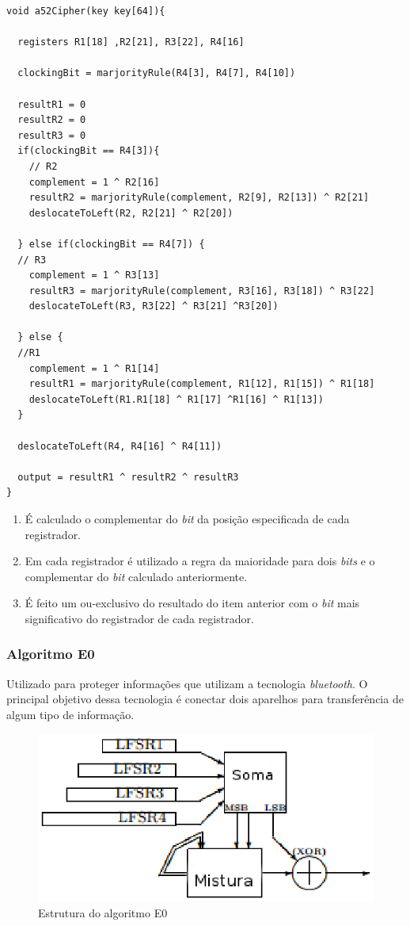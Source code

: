 \begin{lstlisting}[caption={Pseudo-código A5/2}, label=a52-pseudo-code]
void a52Cipher(key key[64]){

  registers R1[18] ,R2[21], R3[22], R4[16]

  clockingBit = marjorityRule(R4[3], R4[7], R4[10])
  
  resultR1 = 0  
  resultR2 = 0  
  resultR3 = 0
  if(clockingBit == R4[3]){
  	// R2 
  	complement = 1 ^ R2[16]
  	resultR2 = marjorityRule(complement, R2[9], R2[13]) ^ R2[21]
  	deslocateToLeft(R2, R2[21] ^ R2[20])
  
  } else if(clockingBit == R4[7]) {
  // R3
  	complement = 1 ^ R3[13]
  	resultR3 = marjorityRule(complement, R3[16], R3[18]) ^ R3[22]
  	deslocateToLeft(R3, R3[22] ^ R3[21] ^R3[20])  
  
  } else {
  //R1
    complement = 1 ^ R1[14]
  	resultR1 = marjorityRule(complement, R1[12], R1[15]) ^ R1[18]
  	deslocateToLeft(R1.R1[18] ^ R1[17] ^R1[16] ^ R1[13]) 
  }
  
  deslocateToLeft(R4, R4[16] ^ R4[11])
  
  output = resultR1 ^ resultR2 ^ resultR3
}
    \end{lstlisting}

\begin{enumerate}
	\item É calculado o complementar do \textit{bit} da posição especificada de cada registrador.
	\item Em cada registrador é utilizado a regra da maioridade para dois \textit{bits} e o complementar do \textit{bit} calculado anteriormente. 
	\item É feito um ou-exclusivo do resultado do item anterior com o \textit{bit} mais significativo do registrador de cada registrador.
\end{enumerate}


\subsubsection{Algoritmo E0}
\label{algorithm-e0}

Utilizado para proteger informações que utilizam a tecnologia \textit{bluetooth}. O principal objetivo dessa tecnologia é conectar dois aparelhos para transferência de algum tipo de informação.

\begin{figure}[h]
	\includegraphics[scale=1]{figuras/e0.eps}
	\caption{Estrutura do algoritmo E0\cite{fluhrer-lucksl}}
	\label{e0-structure}
\end{figure}

